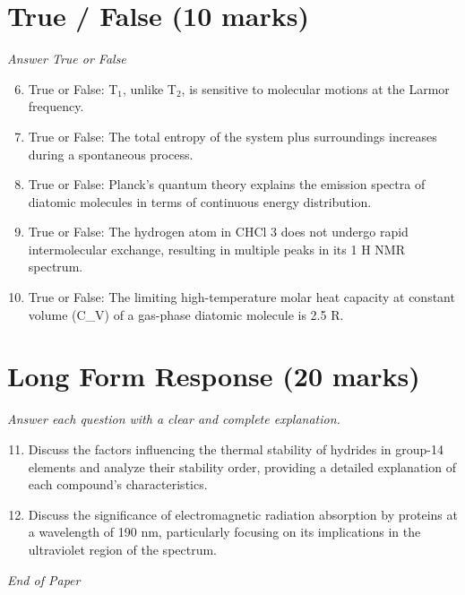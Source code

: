 \documentclass[12pt]{article}
\begin{document}
\section*{True / False (10 marks)}
\textit{Answer True or False}
\begin{enumerate}[label=\arabic*.]
\setcounter{enumi}{5}
\item True or False: T$_{1}$, unlike T$_{2}$, is sensitive to molecular motions at the Larmor frequency.
\item True or False: The total entropy of the system plus surroundings increases during a spontaneous process.
\item True or False: Planck's quantum theory explains the emission spectra of diatomic molecules in terms of continuous energy distribution.
\item True or False: The hydrogen atom in CHCl 3 does not undergo rapid intermolecular exchange, resulting in multiple peaks in its 1 H NMR spectrum.
\item True or False: The limiting high-temperature molar heat capacity at constant volume (C\_V) of a gas-phase diatomic molecule is 2.5 R.
\end{enumerate}

\section*{Long Form Response (20 marks)}
\textit{Answer each question with a clear and complete explanation.}
\begin{enumerate}[label=\arabic*.]
\setcounter{enumi}{10}
\item Discuss the factors influencing the thermal stability of hydrides in group-14 elements and analyze their stability order, providing a detailed explanation of each compound's characteristics.
\item Discuss the significance of electromagnetic radiation absorption by proteins at a wavelength of 190 nm, particularly focusing on its implications in the ultraviolet region of the spectrum.
\end{enumerate}

\vfill
\noindent\textit{End of Paper}
\end{document}
